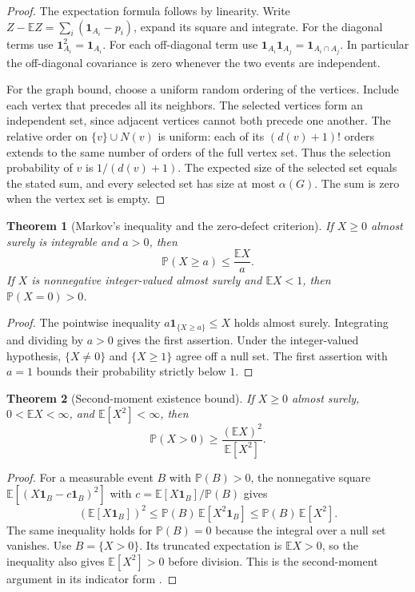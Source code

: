 \documentclass[11pt,oneside,openany]{book}
\theoremstyle{plain}
\newtheorem{theorem}{Theorem}[chapter]
\theoremstyle{definition}
\theoremstyle{remark}
\begin{document}
\begin{proof}
The expectation formula follows by linearity. Write
\(Z-\mathbb E Z=\sum_i(\mathbf 1_{A_i}-p_i)\), expand its square and
integrate. For the diagonal terms use \(\mathbf 1_{A_i}^2=\mathbf
1_{A_i}\). For each off-diagonal term use
\(\mathbf 1_{A_i}\mathbf 1_{A_j}=\mathbf 1_{A_i\cap A_j}\).
In particular the off-diagonal covariance is zero whenever the
two events are independent.

For the graph bound, choose a uniform random ordering of the
vertices. Include each vertex that precedes all its neighbors.
The selected vertices form an independent set, since adjacent
vertices cannot both precede one another. The relative order on
\(\{v\}\cup N(v)\) is uniform: each of its \((d(v)+1)!\) orders
extends to the same number of orders of the full vertex set.
Thus the selection probability of \(v\) is \(1/(d(v)+1)\).
The expected size of the selected set equals the stated sum,
and every selected set has size at most \(\alpha(G)\).
The sum is zero when the vertex set is empty.
\end{proof}

\begin{theorem}[Markov's inequality and the zero-defect criterion]
\label{p205:W21}
If \(X\ge0\) almost surely is integrable and \(a>0\), then
\[
 \mathbb P(X\ge a)\le \frac{\mathbb E X}{a}.
\]
If \(X\) is nonnegative integer-valued almost surely and
\(\mathbb E X<1\), then \(\mathbb P(X=0)>0\).
\end{theorem}

\begin{proof}
The pointwise inequality \(a\mathbf 1_{\{X\ge a\}}\le X\) holds
almost surely. Integrating and dividing by \(a>0\) gives the
first assertion. Under the integer-valued hypothesis,
\(\{X\ne0\}\) and \(\{X\ge1\}\) agree off a null set. The
first assertion with \(a=1\) bounds their probability strictly
below \(1\).
\end{proof}

\begin{theorem}[Second-moment existence bound]
\label{p205:W22}
If \(X\ge0\) almost surely, \(0<\mathbb E X<\infty\), and
\(\mathbb E[X^2]<\infty\), then
\[
  \mathbb P(X>0)\ge
       \frac{(\mathbb E X)^2}{\mathbb E[X^2]} .
\]
\end{theorem}

\begin{proof}
For a measurable event \(B\) with \(\mathbb P(B)>0\), the
nonnegative square
\(\mathbb E[(X\mathbf 1_B-c\mathbf 1_B)^2]\) with
\(c=\mathbb E[X\mathbf 1_B]/\mathbb P(B)\) gives
\[
  (\mathbb E[X\mathbf 1_B])^2\le
      \mathbb P(B)\,\mathbb E[X^2\mathbf 1_B]
      \le \mathbb P(B)\,\mathbb E[X^2].
\]
The same inequality holds for \(\mathbb P(B)=0\) because the
integral over a null set vanishes. Use \(B=\{X>0\}\). Its
truncated expectation is \(\mathbb E X>0\), so the inequality
also gives \(\mathbb E[X^2]>0\) before division.
This is the second-moment argument in its indicator form
\cite{roch}.
\end{proof}
\end{document}
